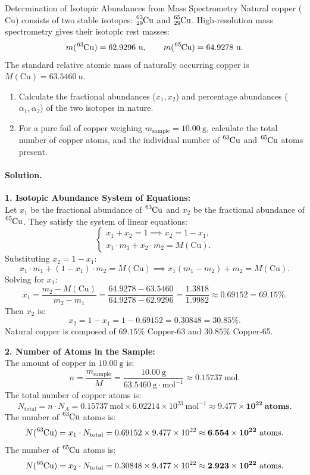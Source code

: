 \begin{workedexample}{Determination of Isotopic Abundances from Mass Spectrometry}
Natural copper ($\mathrm{Cu}$) consists of two stable isotopes: $\ce{^{63}_{29}Cu}$ and $\ce{^{65}_{29}Cu}$. High-resolution mass spectrometry gives their isotopic rest masses:
\[
m(\ce{^{63}Cu}) = 62.9296\ \mathrm{u}, \qquad m(\ce{^{65}Cu}) = 64.9278\ \mathrm{u}.
\]
The standard relative atomic mass of naturally occurring copper is $M(\mathrm{Cu}) = 63.5460\ \mathrm{u}$.
\begin{enumerate}[leftmargin=1.4em,itemsep=3pt]
  \item Calculate the fractional abundances ($x_1, x_2$) and percentage abundances ($\alpha_1, \alpha_2$) of the two isotopes in nature.
  \item For a pure foil of copper weighing $m_{\text{sample}} = 10.00\ \mathrm{g}$, calculate the total number of copper atoms, and the individual number of $\ce{^{63}Cu}$ and $\ce{^{65}Cu}$ atoms present.
\end{enumerate}

\paragraph{Solution.}
\textbf{1. Isotopic Abundance System of Equations:}\\
Let $x_1$ be the fractional abundance of $\ce{^{63}Cu}$ and $x_2$ be the fractional abundance of $\ce{^{65}Cu}$.
They satisfy the system of linear equations:
\[
\begin{cases}
x_1 + x_2 = 1 \implies x_2 = 1 - x_1, \\
x_1 \cdot m_1 + x_2 \cdot m_2 = M(\mathrm{Cu}).
\end{cases}
\]
Substituting $x_2 = 1 - x_1$:
\[
x_1 \cdot m_1 + (1 - x_1) \cdot m_2 = M(\mathrm{Cu}) \implies x_1(m_1 - m_2) + m_2 = M(\mathrm{Cu}).
\]
Solving for $x_1$:
\[
x_1 = \frac{m_2 - M(\mathrm{Cu})}{m_2 - m_1} = \frac{64.9278 - 63.5460}{64.9278 - 62.9296} = \frac{1.3818}{1.9982} \approx \mathbf{0.69152} = \mathbf{69.15\%}.
\]
Then $x_2$ is:
\[
x_2 = 1 - x_1 = 1 - 0.69152 = \mathbf{0.30848} = \mathbf{30.85\%}.
\]
Natural copper is composed of $69.15\%$ Copper-63 and $30.85\%$ Copper-65.

\textbf{2. Number of Atoms in the Sample:}\\
The amount of copper in $10.00\ \mathrm{g}$ is:
\[
n = \frac{m_{\text{sample}}}{M} = \frac{10.00\ \mathrm{g}}{63.5460\ \mathrm{g\cdot mol^{-1}}} \approx 0.15737\ \mathrm{mol}.
\]
The total number of copper atoms is:
\[
N_{\text{total}} = n \cdot N_A = 0.15737\ \mathrm{mol} \times 6.02214 \times 10^{23}\ \mathrm{mol^{-1}} \approx \mathbf{9.477 \times 10^{22}\ \text{atoms}}.
\]
The number of $\ce{^{63}Cu}$ atoms is:
\[
N(\ce{^{63}Cu}) = x_1 \cdot N_{\text{total}} = 0.69152 \times 9.477 \times 10^{22} \approx \mathbf{6.554 \times 10^{22}\ \text{atoms}}.
\]
The number of $\ce{^{65}Cu}$ atoms is:
\[
N(\ce{^{65}Cu}) = x_2 \cdot N_{\text{total}} = 0.30848 \times 9.477 \times 10^{22} \approx \mathbf{2.923 \times 10^{22}\ \text{atoms}}.
\]
\end{workedexample}

